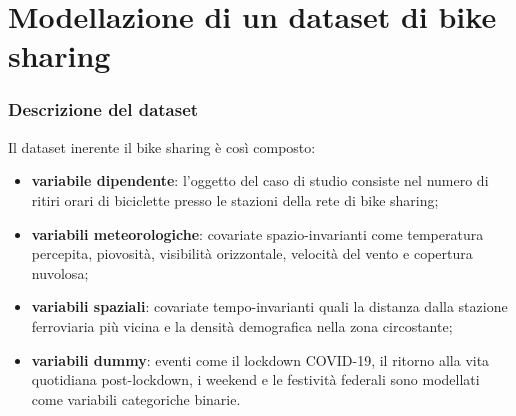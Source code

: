 \section[Modellazione di un dataset di bike sharing]{Modellazione di un dataset di bike sharing}
\begin{frame}
	\frametitle{Descrizione del dataset}
	
	Il dataset inerente il bike sharing è così composto:
	\begin{itemize}
		\justifying
		\item \textbf{variabile dipendente}: l'oggetto del caso di studio consiste nel numero di ritiri orari di biciclette presso le stazioni della rete di bike sharing;
		\item \textbf{variabili meteorologiche}: covariate spazio-invarianti come temperatura percepita, piovosità, visibilità orizzontale, velocità del vento e copertura nuvolosa;
		\item \textbf{variabili spaziali}: covariate tempo-invarianti quali la distanza dalla stazione ferroviaria più vicina e la densità demografica nella zona circostante;
		\item \textbf{variabili dummy}: eventi come il lockdown COVID-\num{19}, il ritorno alla vita quotidiana post-lockdown, i weekend e le festività federali sono modellati come variabili categoriche binarie.
	\end{itemize}	
\end{frame}


